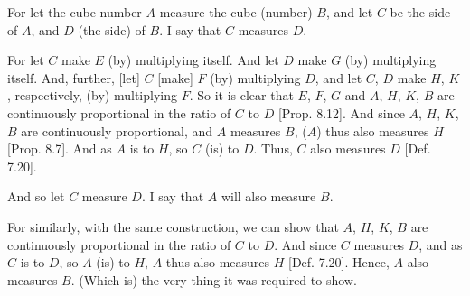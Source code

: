 \begin{Parallel}{}{}
{For let the cube number $A$ measure the cube (number) $B$, and let
$C$ be the side of $A$, and $D$ (the side) of $B$. I say that $C$ measures $D$.

\epsfysize=1.7in
\centerline{}

For let $C$ make $E$ (by) multiplying itself. And let $D$ make $G$ (by)
multiplying itself. And, further, [let] $C$ [make] $F$ (by) multiplying
$D$,  and let  $C$, $D$ make  $H$, $K$, respectively, (by) multiplying
$F$. So it is clear that $E$, $F$, $G$ and $A$, $H$, $K$, $B$ are continuously proportional in the ratio of $C$ to $D$ [Prop. 8.12]. And since $A$, $H$, $K$, $B$ are
continuously proportional, and $A$ measures $B$, ($A$) thus also
measures $H$ [Prop. 8.7]. And as $A$ is to
$H$, so $C$ (is) to $D$. Thus, $C$ also measures $D$ [Def. 7.20].

And so let $C$ measure $D$. I say that $A$ will also measure $B$.

For similarly, with the same construction, we can show that $A$, $H$, $K$, $B$ are continuously proportional in the ratio of $C$ to $D$. And since
$C$ measures $D$, and as $C$ is to $D$, so $A$ (is) to $H$, $A$ thus
also measures $H$ [Def. 7.20]. Hence, $A$ also measures $B$. (Which is) the
very thing it was required to show.}
\end{Parallel}

